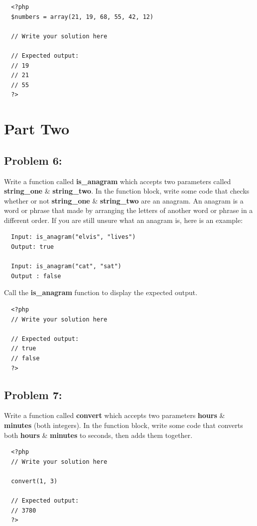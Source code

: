 \documentclass{article}
\begin{document}
\begin{verbatim}
  <?php  
  $numbers = array(21, 19, 68, 55, 42, 12) 
  
  // Write your solution here

  // Expected output:
  // 19
  // 21
  // 55
  ?>
\end{verbatim}

\section*{Part Two}

\subsection*{Problem 6:}
Write a function called \textbf{is\_anagram} which accepts two parameters called \textbf{string\_one} \& \textbf{string\_two}. In the function block, write some code that checks whether or not \textbf{string\_one} \& \textbf{string\_two} are an anagram. An anagram is a word or phrase that made by arranging the letters of another word or phrase in a different order. If you are still unsure what an anagram is, here is an example:

\begin{verbatim}
  Input: is_anagram("elvis", "lives")
  Output: true

  Input: is_anagram("cat", "sat")
  Output : false
\end{verbatim}

Call the \textbf{is\_anagram} function to display the expected output.

\begin{verbatim}
  <?php  
  // Write your solution here

  // Expected output:
  // true
  // false
  ?>
\end{verbatim}

\subsection*{Problem 7:}
Write a function called \textbf{convert} which accepts two parameters \textbf{hours} \& \textbf{minutes} (both integers). In the function block, write some code that converts both \textbf{hours} \& \textbf{minutes} to seconds, then adds them together.

\begin{verbatim}
  <?php  
  // Write your solution here

  convert(1, 3)

  // Expected output:
  // 3780
  ?>
\end{verbatim}
\end{document}
